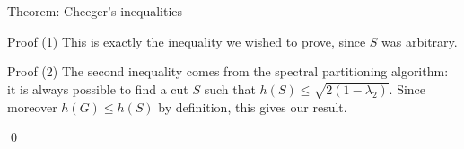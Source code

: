 \documentclass[a4paper]{article}
\begin{document}
\begin{parag}{Theorem: Cheeger's inequalities}
\begin{subparag}{Proof (1)}
        This is exactly the inequality we wished to prove, since $S$ was arbitrary.
    \end{subparag}

    \begin{subparag}{Proof (2)}
        The second inequality comes from the spectral partitioning algorithm: it is always possible to find a cut $S$ such that $h\left(S\right) \leq \sqrt{2\left(1 - \lambda_2\right)}$. Since moreover $h\left(G\right) \leq h\left(S\right)$ by definition, this gives our result.

        \qed
    \end{subparag}
\end{parag}
\end{document}
